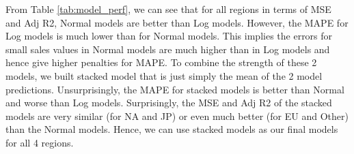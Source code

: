 \documentclass[12pt]{article}
\begin{document}

From Table \ref{tab:model_perf}, we can see that for all regions in terms of MSE and Adj R2, Normal models are better than Log models. However, the MAPE for Log models is much lower than for Normal models. This implies the errors for small sales values in Normal models are much higher than in Log models and hence give higher penalties for MAPE. To combine the strength of these 2 models, we built stacked model that is just simply the mean of the 2 model predictions. Unsurprisingly, the MAPE for stacked models is better than Normal and worse than Log models. Surprisingly, the MSE and Adj R2 of the stacked models are very similar (for NA and JP) or even much better (for EU and Other) than the Normal models. Hence, we can use stacked models as our final models for all 4 regions.
\end{document}
